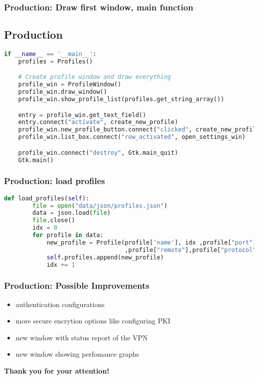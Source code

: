 \documentclass[9pt]{beamer}
\begin{document}
\begin{frame}[fragile]
\frametitle{Production: Draw first window, main function}
	\subsection{Production}

\begin{lstlisting}[language=Python]
if __name__ == '__main__':
	profiles = Profiles()

	# Create profile window and draw everything
	profile_win = ProfileWindow()
	profile_win.draw_window()
	profile_win.show_profile_list(profiles.get_string_array())

	entry = profile_win.get_text_field()
	entry.connect("activate", create_new_profile)
	profile_win.new_profile_button.connect("clicked", create_new_profile, entry)
	profile_win.list_box.connect("row_activated", open_settings_win)

	profile_win.connect("destroy", Gtk.main_quit)
	Gtk.main()
\end{lstlisting}
\end{frame}

\begin{frame}[fragile]
\frametitle{Production: load profiles}
\begin{lstlisting}[language=Python]
def load_profiles(self):
        file = open("data/json/profiles.json")
        data = json.load(file)
        file.close()
        idx = 0
        for profile in data:
            new_profile = Profile(profile['name'], idx ,profile["port"]
                                  ,profile["remote"],profile["protocol"],profile["key"])
            self.profiles.append(new_profile) 
            idx += 1
\end{lstlisting}
\end{frame}

\begin{frame}[fragile]
\frametitle{Production: Possible Improvements}
	\begin{itemize}
		\item authentication configurations
		\item more secure encrytion options like configuring PKI
		\item new window with status report of the VPN
		\item new window showing perfomance graphs	
	\end{itemize}
\end{frame}

\begin{frame}[fragile]
\begin{center}
    \textbf{Thank you for your attention!}\\
\end{center}
\end{frame}
\end{document}

